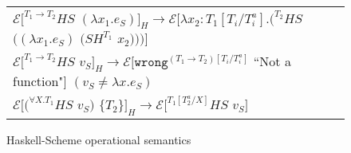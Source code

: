 \begin{figure}[p]
\begin{tabular}{l}
$\mathscr{E}[^{T_{1}\rightarrow T_{2}}HS$ $(\lambda x_{1}.e_{S})]_{H}\rightarrow\mathscr{E}[\lambda x_{2}:T_{1}[T_{i}/T_{i}^{a}].(^{T_{2}}HS$ $((\lambda x_{1}.e_{S})$ $(SH^{T_{1}}$ $x_{2})))]$ \\

\vspace{5pt}

$\mathscr{E}[^{T_{1}\rightarrow T_{2}}HS$ $v_{S}]_{H}\rightarrow\mathscr{E}[\mathtt{wrong}^{(T_{1}\rightarrow T_{2})[T_{i}/T_{i}^{a}]}$ ``Not a function"$]$ $(v_{S}\neq\lambda x.e_{S})$ \\

\vspace{5pt}

$\mathscr{E}[(^{\forall X.T_{1}}HS$ $v_{S})$ $\lbrace T_{2}\rbrace]_{H}\rightarrow\mathscr{E}[^{T_{1}[T^{a}_{2}/X]}HS$ $v_{S}]$
\end{tabular}
\caption{Haskell-Scheme operational semantics}
\label{hsos}
\end{figure}